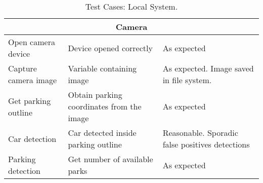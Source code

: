 \begin{table}[H]
{\begin{tabular}{|m{4cm}|m{5cm}||m{5cm}|}
			\multicolumn{3}{c}{\textbf{Camera}}\\\hline
			Open camera device & Device opened correctly & As expected
			\\\hline
			Capture camera image & Variable containing image & As expected. Image saved in file system.
			\\\hline
			Get parking outline & Obtain parking coordinates from the image & As expected
			\\\hline
			Car detection & Car detected inside parking outline & Reasonable. Sporadic false positives detections
			\\\hline
			Parking detection & Get number of available parks & As expected
			\\\hline
		\end{tabular}
	}
	\caption{Test Cases: Local System.}
	\label{table:test_localsystem}
\end{table}
